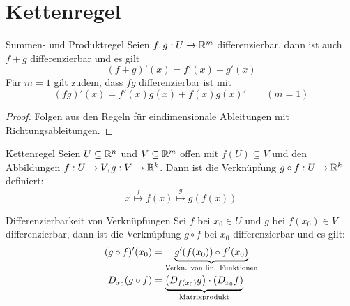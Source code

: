 \section{Kettenregel}
\begin{lemma}{Summen- und Produktregel}{}
Seien $f,g : U \to \mathbb{R}^m$ differenzierbar, dann ist auch $f+g$ differenzierbar und es gilt
$$(f+g)'(x) = f'(x) + g'(x)$$
Für $m=1$ gilt zudem, dass $fg$ differenzierbar ist mit
$$(fg)'(x) = f'(x)g(x) + f(x)g(x)' \qquad (m = 1)$$
\end{lemma}
\begin{proof}
Folgen aus den Regeln für eindimensionale Ableitungen mit Richtungsableitungen.
\end{proof}
\begin{lemma}{Kettenregel}{}
Seien $U \subseteq \mathbb{R}^n$ und $V \subseteq \mathbb{R}^m$ offen mit $f(U) \subseteq V$ und den Abbildungen $f: U \to V, g: V \to \mathbb{R}^k$. Dann ist die Verknüpfung $g \circ f: U \to \mathbb{R}^k$ definiert:
$$x \stackrel{f}{\mapsto} f(x) \stackrel{g}{\mapsto} g(f(x))$$
\end{lemma}
\begin{satz}{Differenzierbarkeit von Verknüpfungen}{}
Sei $f$ bei $x_0 \in U$ und $g$ bei $f(x_0) \in V$ differenzierbar, dann ist die Verknüpfung $g\circ f$ bei $x_0$ differenzierbar und es gilt:
\begin{align*}
    (g\circ f)'(x_0) &= \underbrace{g'(f(x_0)) \circ f'(x_0)}_{\text{Verkn. von lin. Funktionen}}\\
    D_{x_0}(g\circ f) &= \underbrace{\left(D_{f(x_0)}g\right) \cdot \left(D_{x_0}f\right)}_{\text{Matrixprodukt}}
\end{align*}
\end{satz}

